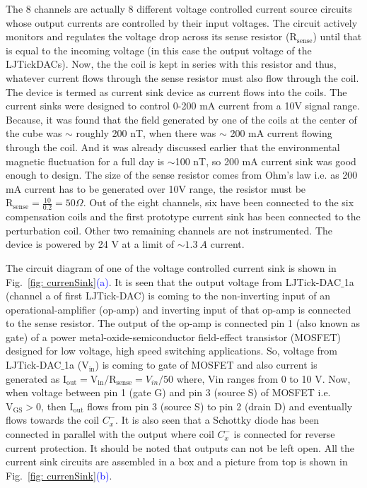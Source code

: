 The 8 channels are actually 8 different voltage controlled current source circuits whose output currents are controlled by their input voltages. The circuit actively monitors and regulates the voltage drop across its sense resistor ($\mathrm{R_{sense}}$) until that is equal to the incoming voltage (in this case the output voltage of the LJTickDACs). Now, the the coil is kept in series with this resistor and thus, whatever current flows through the sense resistor must also flow through the coil. The device is termed as current sink device as current flows into the coils. The current sinks were designed to control 0-200 mA current from a 10V signal range. Because, it was found that the field generated by one of the coils at the center of the cube was $\sim$ roughly 200 nT, when there was $\sim$ 200 mA current flowing through the coil. And it was already discussed earlier that the environmental magnetic fluctuation for a full day is $\sim$100 nT, so 200 mA current sink was good enough to design. The size of the sense resistor comes from Ohm's law i.e. as 200 mA current has to be generated over 10V range, the resistor must be $\mathrm{R_{sense}}=\frac{10}{0.2}=50 \Omega$. Out of the eight channels, six have been connected to the six compensation coils and the first prototype current sink has been connected to the perturbation coil. Other two remaining channels are not instrumented. The device is powered by 24 V at a limit of $\sim 1.3 \: A$ current. 



The circuit diagram of one of the voltage controlled current sink is shown in Fig.~\ref{fig: currenSink}\textcolor{blue}{(a)}. It is seen that the output voltage from LJTick-DAC$\_$1a (channel a of first LJTick-DAC) is coming to the non-inverting input of an operational-amplifier (op-amp) and inverting input of that op-amp is connected to the sense resistor. The output of the op-amp is connected pin 1 (also known as gate) of a power metal-oxide-semiconductor field-effect transistor (MOSFET) designed for low voltage, high
speed switching applications. So, voltage from LJTick-DAC$\_$1a ($\mathrm{V_{in}}$) is coming to gate of MOSFET and also current is generated as $\mathrm{I_{out}=V_{in}/R_{sense}}=V_{in}/50$ where, $\mathrm{Vin}$ ranges from 0 to 10 V. Now, when voltage between pin 1 (gate G) and pin 3 (source S) of MOSFET i.e.  $\mathrm{V_{GS}>0}$, then $\mathrm{I_{out}}$ flows from pin 3 (source S) to pin 2 (drain D) and eventually flows towards the coil $C_x^-$. It is also seen that a Schottky diode has been connected in parallel with the output where coil $C_x^-$ is connected for reverse current protection. It should be noted that outputs can not be left open. All the current sink circuits are assembled in a box and a picture from top is shown in Fig.~\ref{fig: currenSink}\textcolor{blue}{(b)}.


